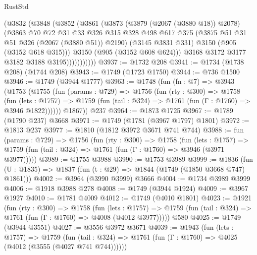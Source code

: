 \begin{lexlean}{RustStd}
\begin{coremodule}
                  (@3832
                    (@3848
                      (@3852
                        (@3861
                          (@3873
                            (@3879 (@2067 (@3880 @18)) @2078)
                            (@3863
                              @70
                              @72
                              @31
                              @33
                              @326
                              @315
                              @328
                              @498
                              @617
                              @375
                              (@3875 @51 @31 @51 @326 (@2067 (@3880 @51)) @2190)
                              (@3145 @3831 @331)
                              @3150
                              (@905 (@3152 @618 @315)))
                            @3150
                            (@905 (@3152 @608 @624)))
                          @3168
                          @3172
                          @3177
                          @3182
                          @3188
                          @3195)))))))))))
@3937 := @1732 @208
@3941 := @1734 (@1738 @208) (@1744 @208)
@3943 := @1749 (@1723 @1750)
@3944 := @736 @1500
@3946 := @1749 (@3944 @1777)
@3963 := @1748
    (fun (fn : @7) =>
    @3943
      (@1753
        (@1755
          (fun (params : @729) =>
          @1756
            (fun (rty : @300) =>
            @1758
              (fun (lets : @1757) =>
              @1759 (fun (tail : @324) => @1761 (fun (Γ : @1760) => @3946 @1822))))))
        @1867))
    @237
@3964 := @1873 @1725
@3967 := @1789 (@1790 @237) @3668
@3971 := @1749 (@1781 (@3967 @1797) @1801)
@3972 := @1813 @237
@3977 := @1810 (@1812 @3972 @3671 @741 @744)
@3988 := fun (params : @729) =>
  @1756
    (fun (rty : @300) =>
    @1758
      (fun (lets : @1757) =>
      @1759 (fun (tail : @324) => @1761 (fun (Γ : @1760) => @3946 (@3971 @3977)))))
@3989 := @1755 @3988
@3990 := @1753 @3989
@3999 := @1836 (fun (U : @1835) => @1837 (fun (t : @29) => @1844 (@1749 (@1850 @3668 @747) @1861)))
@4002 := @3964 (@3990 @3999) @3666
@4004 := @1734 @3989 @3999
@4006 := @1918 @3988 @278
@4008 := @1749 (@3944 @1924)
@4009 := @3967 @1927
@4010 := @1781 @4009
@4012 := @1749 (@4010 @1801)
@4023 := @1921
    (fun (rty : @300) =>
    @1758
      (fun (lets : @1757) =>
      @1759 (fun (tail : @324) => @1761 (fun (Γ : @1760) => @4008 (@4012 @3977)))))
    @580
@4025 := @1749 (@3944 @3551)
@4027 := @3556 @3972 @3671
@4039 := @1943
    (fun (lets : @1757) =>
    @1759 (fun (tail : @324) => @1761 (fun (Γ : @1760) => @4025 (@4012 (@3555 (@4027 @741 @744))))))

\end{coremodule}
\end{lexlean}
